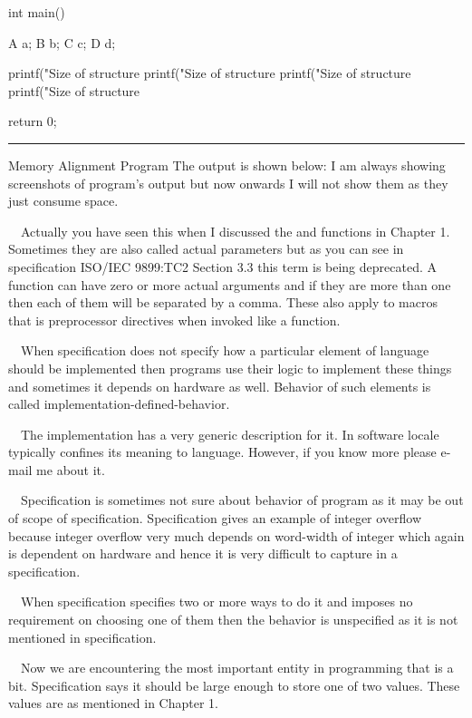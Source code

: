int main()
{
  A a;
  B b;
  C c;
  D d;

  printf("Size of structure %
  printf("Size of structure %
  printf("Size of structure %
  printf("Size of structure %

  return 0;
}

\stopCPP
{}
\hrule\blank[force,1mm]
\startalignment[middle]
Memory Alignment Program
\stopalignment
The output is shown below:
\blank[force, 1mm]
I am always showing screenshots of program's output but now onwards I
will not show them as they just consume space.
\item{}\textreference[argument]~~Actually you have seen
  this when I discussed the  and  functions
  in Chapter 1. Sometimes they are also called actual parameters but
  as you can see in specification ISO/IEC 9899:TC2 Section 3.3 this
  term is being deprecated. A function can have zero or more actual
  arguments and if they are more than one then each of them will be
  separated by a comma. These also apply to macros that is
  preprocessor directives when invoked like a function.
\item{}~~When
  specification does not specify how a particular element of language
  should be implemented then programs use their logic to implement
  these things and sometimes it depends on hardware as well. Behavior
  of such elements is called implementation-defined-behavior.
\item{}~~The
  implementation has a very generic description for it. In software
  locale typically confines its meaning to language. However, if you
  know more please e-mail me about it.
\item{}~~Specification
  is sometimes not sure about behavior of program as it may be out of
  scope of specification. Specification gives an example of integer
  overflow because integer overflow very much depends on word-width of
  integer which again is dependent on hardware and hence it is very
  difficult to capture in a specification.
\item{}~~When
  specification specifies two or more ways to do it and imposes no
  requirement on choosing one of them then the behavior is unspecified
  as it is not mentioned in specification.
\item{}\textreference[bit]~~Now we are encountering the most
  important entity in programming that is a bit. Specification says it
  should be large enough to store one of two values. These
  values are as mentioned in Chapter 1.
\stopitemize
